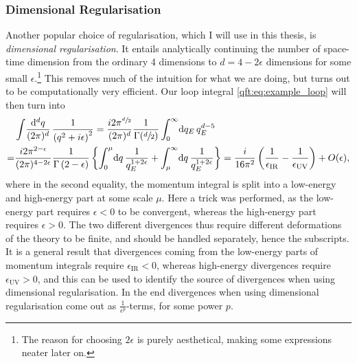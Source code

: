 \documentclass[../main.tex]{subfiles}
\begin{document}
\subsubsection*{Dimensional Regularisation}
Another popular choice of regularisation, which I will use in this thesis, is
\emph{dimensional regularisation}. It entails analytically continuing the
number of space-time dimension from the ordinary 4 dimensions to \(d
= 4-2\epsilon\) dimensions for some small \(\epsilon\).\footnote{The reason for choosing \(2\epsilon\) is purely aesthetical, making some expressions neater later on.} This removes much of
the intuition for what we are doing, but turns out to be computationally very
efficient. Our loop integral \cref{qft:eq:example_loop} will then turn into
\begin{align}
  \label{qft:eq:dimreg_loop_example}
  \nonumber
    & \loopintegral[d]{q} \frac{1}{\pclosed{q^2+i\epsilon}^2} = \frac{i 2\pi^{\sfrac{d}{2}}}{(2\pi)^d} \frac{1}{\Gamma(\sfrac{d}{2})} \integral[_0^\infty]{q_E} q_E^{d-5}                                                                                                                                                 \\
  = & \frac{i 2\pi^{2-\epsilon}}{(2\pi)^{4-2\epsilon}} \frac{1}{\Gamma\pclosed{2-\epsilon}} \cclosed{ \integral[_0^\mu]{q} \frac{1}{q_E^{1+2\epsilon}} + \integral[_\mu^\infty]{q} \frac{1}{q_E^{1+2\epsilon}} } = \frac{i}{16\pi^2} \pclosed{\frac{1}{\epsilon_\text{IR}} - \frac{1}{\epsilon_\text{UV}}} + O(\epsilon),
\end{align}
where in the second equality, the momentum integral is split into a low-energy and high-energy part at some scale \(\mu\).
Here a trick was performed, as the low-energy part requires \(\epsilon < 0\) to be convergent, whereas the high-energy part requires \(\epsilon>0\).
The two different divergences thus require different deformations of the theory to be finite, and should be handled separately, hence the subscripts.
It is a general result that divergences coming from the low-energy parts of momentum integrals require \(\epsilon_{\text{IR}} < 0\), whereas high-energy divergences require \(\epsilon_{\text{UV}} > 0\), and this can be used to identify the source of divergences when using dimensional regularisation.
In the end divergences when using dimensional regularisation come out as \(\frac{1}{\epsilon^p}\)-terms, for some power \(p\).
\medskip
\end{document}
